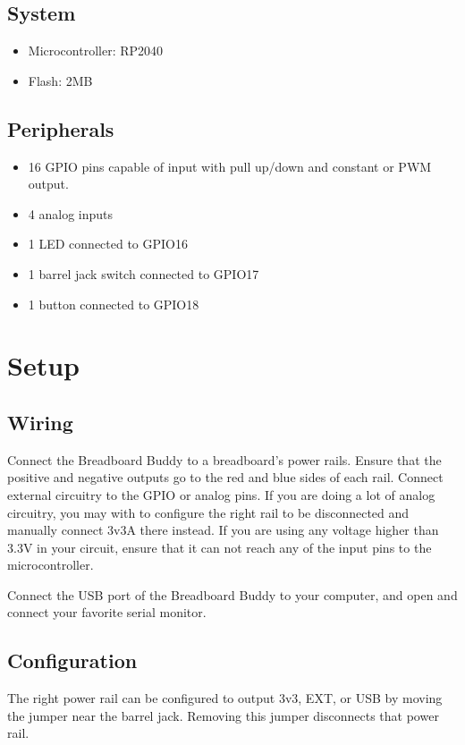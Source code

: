 \documentclass[12pt,letterpaper]{article}
\begin{document}
\subsection{System}
\begin{itemize}
    \item Microcontroller: RP2040
    \item Flash: 2MB
\end{itemize}

\subsection{Peripherals}
\begin{itemize}
    \item 16 GPIO pins capable of input with pull up/down and constant or PWM output.
    \item 4 analog inputs
    \item 1 LED connected to GPIO16
    \item 1 barrel jack switch connected to GPIO17
    \item 1 button connected to GPIO18
\end{itemize}

\section{Setup}

\subsection{Wiring}
Connect the Breadboard Buddy to a breadboard's power rails. Ensure that the positive and negative outputs go to the red and blue sides of each rail. Connect external circuitry to the GPIO or analog pins. If you are doing a lot of analog circuitry, you may with to configure the right rail to be disconnected and manually connect 3v3A there instead. If you are using any voltage higher than 3.3V in your circuit, ensure that it can not reach any of the input pins to the microcontroller.

Connect the USB port of the Breadboard Buddy to your computer, and open and connect your favorite serial monitor.

\subsection{Configuration}

The right power rail can be configured to output 3v3, EXT, or USB by moving the jumper near the barrel jack. Removing this jumper disconnects that power rail.
\end{document}
